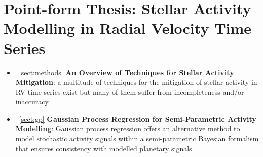 \section{Point-form Thesis: Stellar Activity Modelling in Radial Velocity
  Time Series}
\begin{itemize}
\renewcommand\labelitemi{--}
\item~\ref{sect:methods} \textbf{An Overview of Techniques for Stellar Activity
  Mitigation}: a multitude of techniques for the mitigation of stellar activity in RV time series exist
  but many of them suffer from incompleteness and/or inaccuracy.
\item~\ref{sect:gp} \textbf{Gaussian Process Regression for Semi-Parametric
  Activity Modelling}: Gaussian process regression offers an alternative method to model
  stochastic activity signals within a semi-parametric Bayesian formalism that ensures consistency
  with modelled planetary signals.
\end{itemize}
